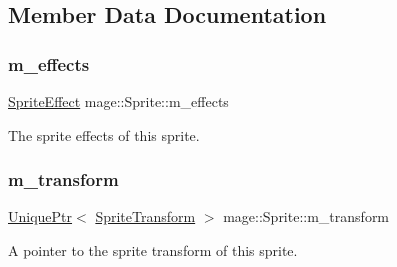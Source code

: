 \subsection{Member Data Documentation}
\hypertarget{classmage_1_1_sprite_a87a51b2b131c28bad75768d14defa3c1}{}\label{classmage_1_1_sprite_a87a51b2b131c28bad75768d14defa3c1} 
\subsubsection{\texorpdfstring{m\+\_\+effects}{m\_effects}}
{\footnotesize\ttfamily \hyperlink{namespacemage_a9cfe18123066ba4236f548f9de75d881}{Sprite\+Effect} mage\+::\+Sprite\+::m\+\_\+effects\hspace{0.3cm}{\ttfamily [private]}}

The sprite effects of this sprite. \hypertarget{classmage_1_1_sprite_ae9907dd9d43fe2ce025bbc86b06dc7a3}{}\label{classmage_1_1_sprite_ae9907dd9d43fe2ce025bbc86b06dc7a3} 
\subsubsection{\texorpdfstring{m\+\_\+transform}{m\_transform}}
{\footnotesize\ttfamily \hyperlink{namespacemage_a3316d7143a973e37adf1110f2e80ca31}{Unique\+Ptr}$<$ \hyperlink{structmage_1_1_sprite_transform}{Sprite\+Transform} $>$ mage\+::\+Sprite\+::m\+\_\+transform\hspace{0.3cm}{\ttfamily [private]}}

A pointer to the sprite transform of this sprite. 